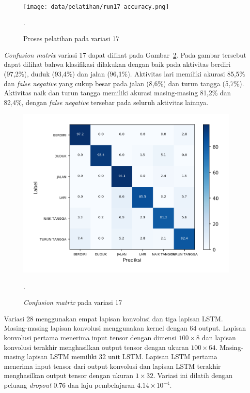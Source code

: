 \begin{figure}[h!]
    \centering
    \texttt{[image: data/pelatihan/run17-accuracy.png]}
    \caption{Proses pelatihan pada variasi 17}.
    \label{gambar:run17-training}
\end{figure}

\textit{Confusion matrix} variasi 17 dapat dilihat pada Gambar~\ref{gambar:run17-confusion-martix}. Pada gambar tersebut dapat dilihat bahwa klasifikasi dilakukan dengan baik pada aktivitas berdiri (97,2\%), duduk (93,4\%) dan jalan (96,1\%). Aktivitas lari memiliki akurasi 85,5\% dan \textit{false negative} yang cukup besar pada jalan (8,6\%) dan turun tangga (5,7\%). Aktivitas naik dan turun tangga memiliki akurasi masing-masing 81,2\% dan 82,4\%, dengan \textit{false negative} tersebar pada seluruh aktivitas lainnya.

\begin{figure}[h!]
    \centering
    \includegraphics[width=13cm]{gambar/hasil-pembahasan/run17-confusion-matrix.png}
    \caption{\textit{Confusion matrix} pada variasi 17}.
    \label{gambar:run17-confusion-martix}
\end{figure}

Variasi 28 menggunakan empat lapisan konvolusi dan tiga lapisan LSTM\@. Masing-masing lapisan konvolusi menggunakan kernel dengan $64$ output. Lapisan konvolusi pertama menerima input tensor dengan dimensi $100 \times 8$ dan lapisan konvolusi terakhir menghasilkan output tensor dengan ukuran $100 \times 64$. Masing-masing lapisan LSTM memiliki $32$ unit LSTM\@. Lapisan LSTM pertama menerima input tensor dari output konvolusi dan lapisan LSTM terakhir menghasilkan output tensor dengan ukuran $1 \times 32$. Variasi ini dilatih dengan peluang \textit{dropout} $0.76$ dan laju pembelajaran $4.14 \times 10^{-4}$.

